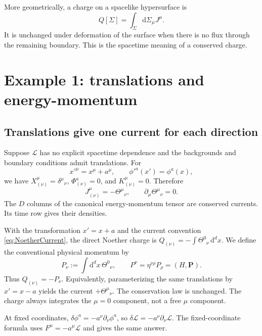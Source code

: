 \documentclass[11pt]{article}
\newcommand{\dd}{\mathrm{d}}
\newcommand{\Lag}{\mathcal{L}}
\newcommand{\Th}{\Theta}
\begin{document}
More geometrically, a charge on a spacelike hypersurface is
\begin{equation}
Q[\Sigma]=\int_\Sigma\dd\Sigma_\mu J^\mu.
\end{equation}
It is unchanged under deformation of the surface when there is no flux
through the remaining boundary. This is the spacetime meaning of a
conserved charge.

\section{Example 1: translations and energy-momentum}

\subsection{Translations give one current for each direction}
Suppose \(\Lag\) has no explicit spacetime dependence and the backgrounds
and boundary conditions admit translations. For
\begin{equation}
x'^\mu=x^\mu+a^\mu,\qquad \phi'^a(x')=\phi^a(x),
\end{equation}
we have \(X_{(\nu)}^\mu=\delta^\mu{}_{\nu}\),
\(\Phi_{(\nu)}^a=0\), and \(K_{(\nu)}^\mu=0\). Therefore
\begin{equation}
J_{(\nu)}^\mu=-\Th^\mu{}_{\nu},\qquad
\boxed{\partial_\mu\Th^\mu{}_{\nu}=0.}
\label{eq:translationCurrent}
\end{equation}
The \(D\) columns of the canonical energy-momentum tensor are conserved
currents. Its time row gives their densities.

\begin{remarkbox}
With the transformation \(x'=x+a\) and the current convention
\eqref{eq:NoetherCurrent}, the direct Noether charge is
\(Q_{(\nu)}=-\int\Th^0{}_{\nu}\,\dd^d x\).
We define the conventional physical momentum by
\[
P_\nu:=\int\dd^d x\,\Th^0{}_{\nu},\qquad
P^\nu=\eta^{\nu\rho}P_\rho=(H,\bm P).
\]
Thus \(Q_{(\nu)}=-P_\nu\). Equivalently, parameterizing the same
translations by \(x'=x-a\) yields the current \(+\Th^\mu{}_{\nu}\).
The conservation law is unchanged. The charge always integrates the
\(\mu=0\) component, not a free \(\mu\) component.
\end{remarkbox}

At fixed coordinates, \(\delta\phi^a=-a^\nu\partial_\nu\phi^a\), so
\(\delta\Lag=-a^\nu\partial_\nu\Lag\). The fixed-coordinate formula
uses \(F^\mu=-a^\mu\Lag\) and gives the same answer.
\end{document}
